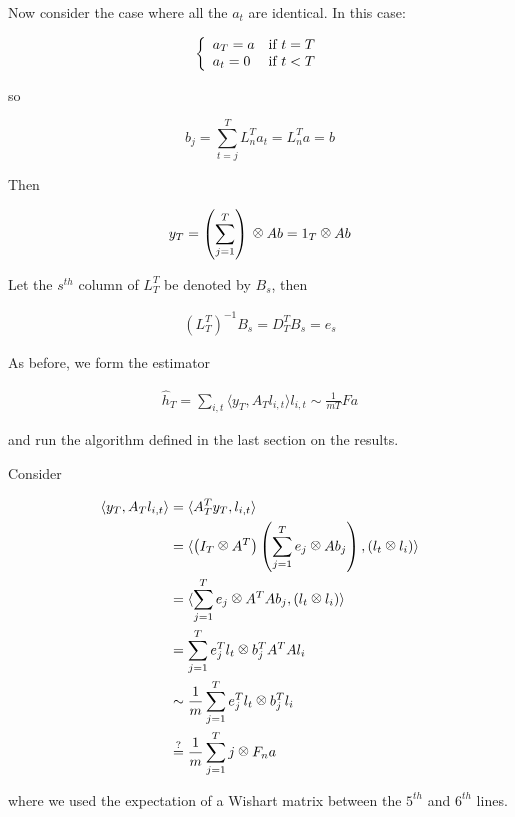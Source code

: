 \documentclass{article}
\begin{document}
\begin{example}
Now consider the case where all the \(a_t\) are identical. In this case:

\begin{equation}
\left\{ \begin{array}{ll} a_T = a & \mbox{if } t=T \\ a_t = 0 & \mbox{if } t < T \end{array} \right.
\end{equation}

so

\begin{equation}
b_j = \sum_{t=j}^T L_n^T a_t = L_n^T a = b
\end{equation}

Then

\begin{equation}
y_T = \left( \sum_{j=1}^T \right) \kronecker Ab = 1_T \kronecker Ab
\end{equation}
\end{example}

Let the \(s^{th}\) column of \(L_T^T\) be denoted by \(B_s\), then

\begin{align*}
\left(L_T^T\right)^{-1}B_s = D_T^T B_s = e_s
\end{align*}



As before, we form the estimator

\begin{align*}
\hat{h}_T = \sum_{i,t} \langle y_T, A_T l_{i,t} \rangle l_{i,t} \sim \frac{1}{mT} Fa
\end{align*}

and run the algorithm defined in the last section on the results.

Consider 

\begin{align*}
\langle y_T, A_T l_{i,t} \rangle &= \langle A_T^T y_T,l_{i,t} \rangle \\
&= \langle \left(I_T \kronecker A^T\right)\left(\sum_{j=1}^T e_j \kronecker Ab_j\right), \left(l_t \kronecker l_i\right)\rangle \\
&= \langle \sum_{j=1}^T e_j \kronecker A^TAb_j, \left(l_t \kronecker l_i\right)\rangle \\
&= \sum_{j=1}^T e_j^T l_t \kronecker b_j^TA^TAl_i \\
&\sim \frac{1}{m}\sum_{j=1}^T e_j^T l_t \kronecker b_j^Tl_i\\
&\stackrel{?}{=} \frac{1}{m}\sum_{j=1}^T j \kronecker F_n a
\end{align*}

where we used the expectation of a Wishart matrix between the \(5^{th}\) and \(6^{th}\) lines.
\end{document}
